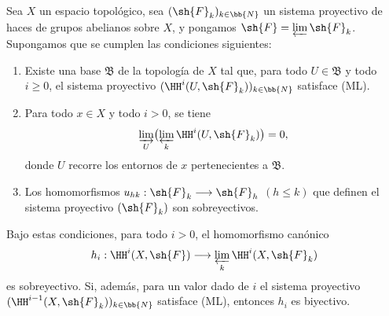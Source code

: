 \documentclass[oneside]{amsart}
\renewcommand{\leq}{\leqslant}
\renewcommand{\geq}{\geqslant}
\newcommand{\oldpage}[2][]{{\marginnote{\normalfont\textbf{#1}~|~#2}}\ignorespaces}
\let\EGAOriginalLabel\label
\renewcommand{\label}[1]{\phantomsection\EGAOriginalLabel{#1}}
\begin{document}
\begin{proposition}[13.3.1]
\label{0.13.3.1}
\oldpage[0\textsubscript{III}]{68}
Sea $X$ un espacio topológico, sea
$(\sh{F}_k)_{k\in\bb{N}}$ un sistema proyectivo de haces de
grupos abelianos sobre $X$, y pongamos
$\sh{F}=\varprojlim\sh{F}_k$.
Supongamos que se cumplen las condiciones siguientes:
\begin{enumerate}
  \item[{\rm(i)}]
  Existe una base $\mathfrak{B}$ de la topología de $X$ tal que,
  para todo $U\in\mathfrak{B}$ y todo $i\geq0$, el sistema
  proyectivo
  $(\HH^i(U,\sh{F}_k))_{k\in\bb{N}}$ satisface \textup{(ML)}.

  \item[{\rm(ii)}]
  Para todo $x\in X$ y todo $i>0$, se tiene
  \[
    \varinjlim_U\bigl(\varprojlim_k
    \HH^i(U,\sh{F}_k)\bigr)=0,
  \]
  donde $U$ recorre los entornos de $x$ pertenecientes a
  $\mathfrak{B}$.

  \item[{\rm(iii)}]
  Los homomorfismos
  $u_{hk}:\sh{F}_k\longrightarrow\sh{F}_h$ $(h\leq k)$ que definen el
  sistema proyectivo $(\sh{F}_k)$ son sobreyectivos.
\end{enumerate}
Bajo estas condiciones, para todo $i>0$, el homomorfismo canónico
\[
  h_i:\HH^i(X,\sh{F})
  \longrightarrow
  \varprojlim_k\HH^i(X,\sh{F}_k)
\]
es sobreyectivo. Si, además, para un valor dado de $i$ el sistema
proyectivo
$(\HH^{i-1}(X,\sh{F}_k))_{k\in\bb{N}}$ satisface \textup{(ML)}, entonces $h_i$ es
biyectivo.
\end{proposition}
\end{document}
